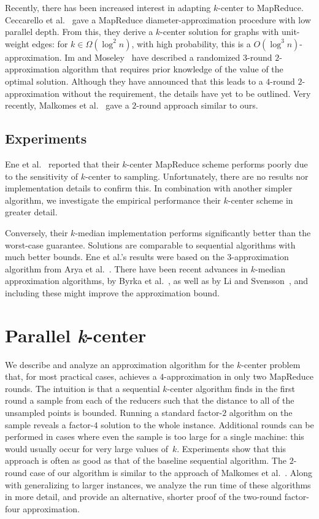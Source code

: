 \documentclass[11pt]{article}
\begin{document}
Recently, there has been increased interest in adapting $k$-center
to Map\-Reduce. 
Ceccarello et al.~\cite{DBLP:CeccarelloPPU14} gave
a MapReduce diameter-approximation procedure with low parallel depth.
From this, they derive a
$k$-center solution for graphs with unit-weight edges: 
for $k\in \Omega(\log^2 n)$,
with high probability, this is a $O(\log^3 n)$-approximation. 
Im and Moseley~\cite{im2015} have described a
randomized $3$-round $2$-approximation algorithm that requires
prior knowledge of the value of the optimal solution.
Although they have announced that this leads
to a $4$-round $2$-approximation without the requirement,
the details have yet to be outlined.
Very recently, Malkomes et al.~\cite{malkomes2015fast} gave a $2$-round approach similar to ours.



\subsection{Experiments}
Ene et al.~\cite{ene2011fast} reported that their $k$-center MapReduce scheme
performs poorly due to the sensitivity of $k$-center to sampling.
Unfortunately, there are no results nor implementation details to confirm this.
In combination with another simpler algorithm, we investigate the empirical performance their $k$-center scheme in greater detail.

Conversely, their $k$-median implementation performs significantly better than the worst-case guarantee.
Solutions are comparable to sequential algorithms with much better bounds. 
Ene et al.'s results were based on the $3$-approximation algorithm
from Arya et al.~\cite{arya2004local}.
There have been recent advances in $k$-median approximation algorithms, by Byrka et al.~\cite{DBLP:ByrkaPRST15}, as well as by Li and Svensson~\cite{li2013approximating}, and including these might improve the approximation bound.


\section{Parallel \emph{k}-center}

We describe and analyze an approximation algorithm for the $k$-center problem that, for most practical cases, achieves a $4$-approximation in only two MapReduce rounds.
The intuition is that a sequential $k$-center algorithm finds in the first
round a sample from  each of the reducers
such that the distance to all of the unsampled points is bounded.
Running a standard factor-$2$ algorithm on the sample
reveals a factor-$4$ solution to the whole instance.
Additional rounds can be performed in cases where even the sample is too large
for a single machine:
this would usually occur for very large values of~$k$. 
Experiments show that this approach is often as good as that of the baseline
sequential algorithm.
The $2$-round case of our algorithm is similar to the approach of Malkomes et
al.~\cite{malkomes2015fast}.
Along with generalizing to larger instances, we analyze the run time of these
algorithms in more detail,
and provide an alternative, shorter proof of the two-round factor-four
approximation.
\end{document}
